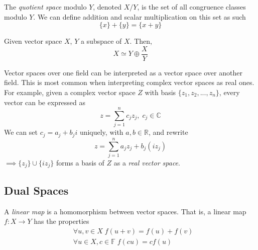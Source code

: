 \documentclass{article}
\begin{document}
    \begin{definition}
      The \textit{quotient space} modulo $Y$, denoted $ X / Y$, is the set of all congruence classes modulo $Y$. We can define addition and scalar multiplication on this set as such 
      \begin{equation}
        \{ x\} + \{ y\} = \{ x + y\}
      \end{equation}
    \end{definition}

    \begin{proposition}
      Given vector space $X$, $Y$ a subspace of $X$. Then, 
      \begin{equation}
        X \simeq Y \oplus \frac{X}{Y}
      \end{equation}
    \end{proposition}

    Vector spaces over one field can be interpreted as a vector space over another field. This is most common when interpreting complex vector spaces as real ones. For example, given a complex vector space $Z$ with basis $\{z_1, z_2, ..., z_n\}$, every vector can be expressed as
    \begin{equation}
      z = \sum_{j=1}^n c_j z_j, \; c_j \in \mathbb{C}
    \end{equation}
    We can set $c_j = a_j + b_j i$ uniquely, with $a, b \in \mathbb{R}$, and rewrite
    \begin{equation}
      z = \sum_{j=1}^n a_j z_j + b_j (i z_j)
    \end{equation}
    $\implies \{ z_j\} \cup \{ i z_j\}$ forms a basis of $Z$ as a \textit{real vector space}. 

  \subsection{Dual Spaces}

    \begin{definition}
      A \textit{linear map} is a homomorphism between vector spaces. That is, a linear map $f: X \longrightarrow Y$ has the properties 
      \begin{align*}
        & \forall u, v \in X \; f(u + v) = f(u) + f(v) \\
        & \forall u \in X, c \in \mathbb{F} \; f(c u) = c f(u) 
      \end{align*}
    \end{definition}
\end{document}
